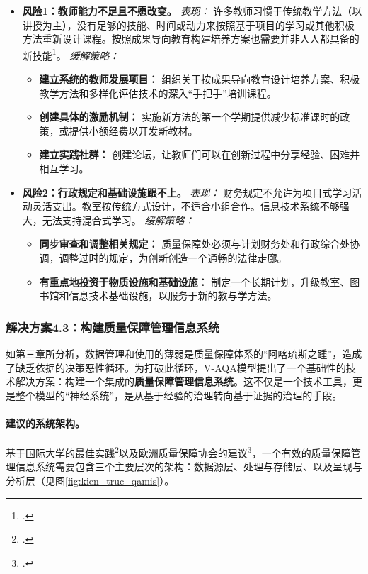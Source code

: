 \begin{itemize}
    \item \textbf{风险1：教师能力不足且不愿改变。}
    \textit{表现：} 许多教师习惯于传统教学方法（以讲授为主），没有足够的技能、时间或动力来按照基于项目的学习或其他积极方法重新设计课程。按照成果导向教育构建培养方案也需要并非人人都具备的新技能\footcite{ijlter_elo_copy}。
    \textit{缓解策略：}
    \begin{itemize}
        \item \textbf{建立系统的教师发展项目：} 组织关于按成果导向教育设计培养方案、积极教学方法和多样化评估技术的深入“手把手”培训课程。
        \item \textbf{创建具体的激励机制：} 实施新方法的第一个学期提供减少标准课时的政策，或提供小额经费以开发新教材。
        \item \textbf{建立实践社群：} 创建论坛，让教师们可以在创新过程中分享经验、困难并相互学习。
    \end{itemize}

    \item \textbf{风险2：行政规定和基础设施跟不上。}
    \textit{表现：} 财务规定不允许为项目式学习活动灵活支出。教室按传统方式设计，不适合小组合作。信息技术系统不够强大，无法支持混合式学习。
    \textit{缓解策略：}
    \begin{itemize}
        \item \textbf{同步审查和调整相关规定：} 质量保障处必须与计划财务处和行政综合处协调，调整过时的规定，为创新创造一个通畅的法律走廊。
        \item \textbf{有重点地投资于物质设施和基础设施：} 制定一个长期计划，升级教室、图书馆和信息技术基础设施，以服务于新的教与学方法。
    \end{itemize}
\end{itemize}





\subsubsection{解决方案4.3：构建质量保障管理信息系统}
\label{subsubsec:giaiphap_qamis}

如第三章所分析，数据管理和使用的薄弱是质量保障体系的“阿喀琉斯之踵”，造成了缺乏依据的决策恶性循环。为打破此循环，V-AQA模型提出了一个基础性的技术解决方案：构建一个集成的\textbf{质量保障管理信息系统}。这不仅是一个技术工具，更是整个模型的“神经系统”，是从基于经验的治理转向基于证据的治理的手段。

\paragraph{建议的系统架构。}
基于国际大学的最佳实践\footcite{seaairweb_journal_v22}以及欧洲质量保障协会的建议\footcite{enqa_forum_report_201X}，一个有效的质量保障管理信息系统需要包含三个主要层次的架构：数据源层、处理与存储层、以及呈现与分析层（见图\ref{fig:kien_truc_qamis}）。

